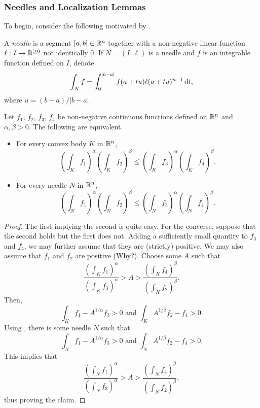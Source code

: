 \subsubsection{Needles and Localization Lemmas}

To begin, consider the following motivated by .

\begin{definition}
	A \textit{needle} is a segment $[a,b]\in\mathbb{R}^n$ together with a non-negative linear function $\ell:I\to\mathbb{R}^{\geq 0}$ not identically $0$. If $N=(I,\ell)$ is a needle and $f$ is an integrable function defined on $I$, denote
	\[ \int_N f = \int_{0}^{|b-a|} f(a+tu)\ell(a+tu)^{n-1} \operatorname{d}\!{t}, \]
	where $u=(b-a)/|b-a|$.
\end{definition}

\begin{lemma}
	\label{lem: 5.1}
	Let $f_1$, $f_2$, $f_3$, $f_4$ be non-negative continuous functions defined on $\mathbb{R}^n$ and $\alpha,\beta>0$. The following are equivalent.
	\begin{itemize}
		\item For every convex body $K$ in $\mathbb{R}^n$,
			\[ \left(\int_K f_1\right)^\alpha \left(\int_K f_2\right)^\beta \leq \left(\int_K f_3\right)^\alpha \left(\int_K f_4\right)^\beta. \]
		\item For every needle $N$ in $\mathbb{R}^n$,
			\[ \left(\int_N f_1\right)^\alpha \left(\int_N f_2\right)^\beta \leq \left(\int_N f_3\right)^\alpha \left(\int_N f_4\right)^\beta. \]
	\end{itemize}
\end{lemma}
\begin{proof}
	The first implying the second is quite easy. For the converse, suppose that the second holds but the first does not.
	Adding a sufficiently small quantity to $f_3$ and $f_4$, we may further assume that they are (strictly) positive. We may also assume that $f_1$ and $f_2$ are positive (Why?). Choose some $A$ such that
	\[ \frac{\left(\int_K f_1\right)^\alpha}{\left(\int_K f_3\right)^\alpha} > A > \frac{\left(\int_K f_4\right)^\beta}{\left(\int_K f_2\right)^\beta}. \]
	Then,
	\[ \int_K f_1 - A^{1/\alpha}f_3 > 0 \text{ and } \int_K A^{1/\beta}f_2 - f_4 > 0. \]
	Using , there is some needle $N$ such that
	\[ \int_N f_1 - A^{1/\alpha}f_3 > 0 \text{ and } \int_N A^{1/\beta}f_2 - f_4 > 0. \]
	This implies that
	\[ \frac{\left(\int_N f_1\right)^\alpha}{\left(\int_N f_3\right)^\alpha} > A > \frac{\left(\int_N f_4\right)^\beta}{\left(\int_N f_2\right)^\beta}, \]
	thus proving the claim.
\end{proof}

